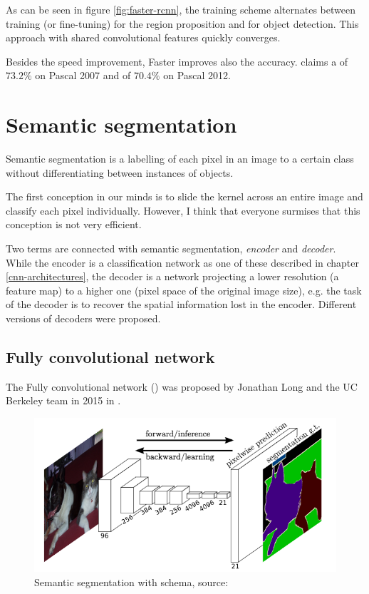 As can be seen in figure \ref{fig:faster-rcnn}, the training scheme alternates between training (or fine-tuning) for the region proposition and for object detection. This approach with shared convolutional features quickly converges.

Besides the speed improvement, Faster  improves also the accuracy. \cite{faster-rcnn} claims a  of $73.2 \%$ on Pascal  2007 and of $70.4 \%$ on Pascal  2012.


\section{Semantic segmentation}
\label{semantic-segmentation}

Semantic segmentation is a labelling of each pixel in an image to a certain class without differentiating between instances of objects.

The first conception in our minds is to slide the kernel across an entire image and classify each pixel individually. However, I think that everyone surmises that this conception is not very efficient.

Two terms are connected with semantic segmentation, \textit{encoder} and \textit{decoder}. While the encoder is a classification network as one of these described in chapter \ref{cnn-architectures}, the decoder is a network projecting a lower resolution (a feature map) to a higher one (pixel space of the original image size), e.g. the task of the decoder is to recover the spatial information lost in the encoder. Different versions of decoders were proposed.

\subsection{Fully convolutional network}
\label{fcns}

The Fully convolutional network () was proposed by Jonathan Long and the UC Berkeley team in 2015 in \cite{fcns}.

\begin{figure}[H]
   \centering
	\includegraphics[width=.8\linewidth]{./pictures/fcns.png}
	\caption[Fully convolutional network]{Semantic segmentation with  schema, source: \cite{fcns}}
      \label{fig:fcns}
\end{figure}

